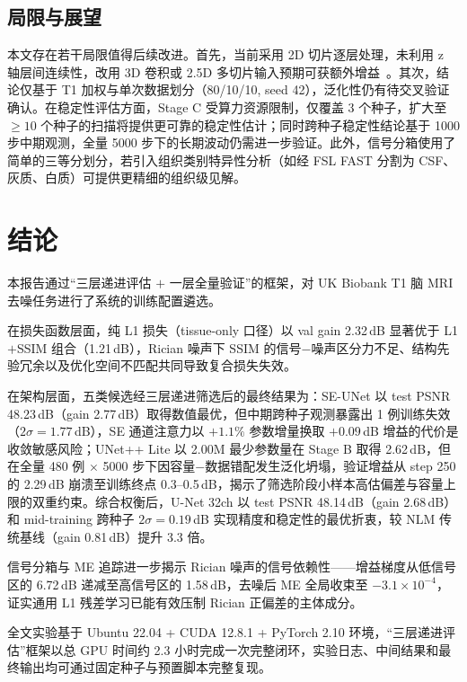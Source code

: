 \documentclass[UTF8,a4paper,12pt]{ctexart}
\begin{document}
\subsection{局限与展望}
本文存在若干局限值得后续改进。首先，当前采用 2D 切片逐层处理，未利用 z 轴层间连续性，改用 3D 卷积或 2.5D 多切片输入预期可获额外增益~\cite{Zhao2021MC3DCNN}。其次，结论仅基于 T1 加权与单次数据划分（80/10/10, seed 42），泛化性仍有待交叉验证确认。在稳定性评估方面，Stage C 受算力资源限制，仅覆盖 3 个种子，扩大至 $\ge 10$ 个种子的扫描将提供更可靠的稳定性估计；同时跨种子稳定性结论基于 1000 步中期观测，全量 5000 步下的长期波动仍需进一步验证。此外，信号分箱使用了简单的三等分划分，若引入组织类别特异性分析（如经 FSL FAST 分割为 CSF、灰质、白质）可提供更精细的组织级见解。

\section{结论}
本报告通过``三层递进评估 $+$ 一层全量验证''的框架，对 UK Biobank T1 脑 MRI 去噪任务进行了系统的训练配置遴选。

在损失函数层面，纯 L1 损失（tissue-only 口径）以 val gain 2.32\,dB 显著优于 L1$+$SSIM 组合（1.21\,dB），Rician 噪声下 SSIM 的信号$-$噪声区分力不足、结构先验冗余以及优化空间不匹配共同导致复合损失失效。

在架构层面，五类候选经三层递进筛选后的最终结果为：SE-UNet 以 test PSNR 48.23\,dB（gain 2.77\,dB）取得数值最优，但中期跨种子观测暴露出 1 例训练失效（$2\sigma=1.77$\,dB），SE 通道注意力以 $+1.1\%$ 参数增量换取 $+0.09$\,dB 增益的代价是收敛敏感风险；UNet++ Lite 以 2.00M 最少参数量在 Stage B 取得 2.62\,dB，但在全量 480 例 $\times$ 5000 步下因容量$-$数据错配发生泛化坍塌，验证增益从 step 250 的 2.29\,dB 崩溃至训练终点 0.3--0.5\,dB，揭示了筛选阶段小样本高估偏差与容量上限的双重约束。综合权衡后，U-Net 32ch 以 test PSNR 48.14\,dB（gain 2.68\,dB）和 mid-training 跨种子 $2\sigma=0.19$\,dB 实现精度和稳定性的最优折衷，较 NLM 传统基线（gain 0.81\,dB）提升 3.3 倍。

信号分箱与 ME 追踪进一步揭示 Rician 噪声的信号依赖性——增益梯度从低信号区的 6.72\,dB 递减至高信号区的 1.58\,dB，去噪后 ME 全局收束至 $-3.1\times 10^{-4}$，证实通用 L1 残差学习已能有效压制 Rician 正偏差的主体成分。

全文实验基于 Ubuntu 22.04 + CUDA 12.8.1 + PyTorch 2.10 环境，``三层递进评估''框架以总 GPU 时间约 2.3 小时完成一次完整闭环，实验日志、中间结果和最终输出均可通过固定种子与预置脚本完整复现。



\end{document}
